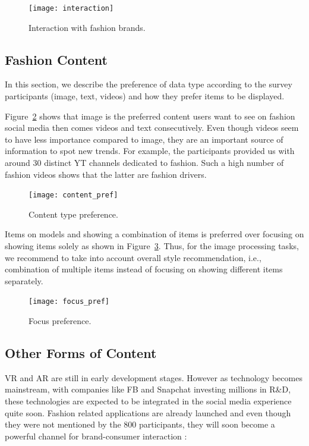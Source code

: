 \begin{figure}[htb] \centering 
  \texttt{[image: interaction]}
  \caption{Interaction with fashion brands.}
  \label{fig:inter}
\end{figure}

\subsection{Fashion Content}

In this section, we describe the preference of data type according to the survey participants  (image, text, videos) and how they prefer items to be displayed.
  
Figure~\ref{fig:content} shows that image is the preferred content users want to see on fashion social media then comes videos and text consecutively. Even though videos seem to have less importance compared to image, they are an important source of information to spot new trends. For example, the participants provided us with around 30 distinct \ac{YT} channels dedicated to fashion. Such a high number of fashion videos shows that the latter are fashion drivers.


\begin{figure}[htb] \centering 
  \texttt{[image: content\_pref]}
  \caption{Content type preference.}
  \label{fig:content}
\end{figure}



Items on models and showing a combination of items is preferred over focusing on showing items solely as shown in Figure~\ref{fig:focus}. Thus, for the image processing tasks, we recommend to take into account overall style recommendation, i.e., combination of multiple items instead of focusing on showing different items separately.


\begin{figure}[htb] \centering 
  \texttt{[image: focus\_pref]}
  \caption{Focus preference.}
  \label{fig:focus}
\end{figure}

\subsection{Other Forms of Content}


VR and AR are still in early development stages. However as technology becomes mainstream, with companies like \ac{FB} and Snapchat investing millions in R\&D, these technologies are expected to be integrated in the social media experience quite soon. Fashion related applications are already launched and even though they were not mentioned by the 800 participants, they will soon become a powerful channel for brand-consumer interaction : 

